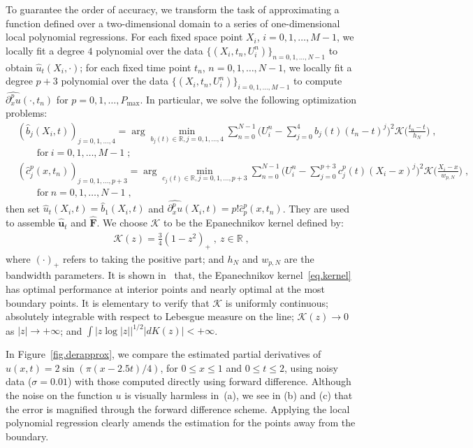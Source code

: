\documentclass[a4paper,11pt]{article}
\newcommand{\bF}{\mathbf{F}}
\newcommand{\bu}{\mathbf{u}}
\begin{document}
To guarantee the order of accuracy, we transform the task of approximating a function defined over a two-dimensional domain to a series of one-dimensional local polynomial regressions. For each fixed space point $X_i$, $i=0,1,\dots,M-1$, we locally fit a degree $4$ polynomial over the data $\{(X_i,t_n,U_i^n)\}_{n=0,1,\dots,N-1}$ to obtain $\widehat{u}_t(X_i,\cdot)$; for each fixed time point $t_n$, $n=0,1,\dots,N-1$, we locally fit a degree $p+3$ polynomial over the data $\{(X_i,t_n,U_i^n)\}_{i=0,1,\dots,M-1}$ to compute $\widehat{\partial_x^pu}(\cdot,t_n)$ for $p=0,1,\dots,P_{\max}$. In particular, we solve the following optimization problems:
\begin{align}
&(\widehat{b}_j(X_i,t))_{j=0,1,\dots,4}=\arg\min_{b_j(t)\in\mathbb{R},j=0,1,\dots,4}\sum_{n=0}^{N-1}\big(U_i^n-\sum_{j=0}^{4}b_j(t)(t_n-t)^j\big)^2\mathcal{K}\big(\frac{t_n-t}{h_N}\big)\;,\nonumber\\
&\quad\quad\text{for}~i=0,1,\dots,M-1\;;\\
&(\widehat{c}^p_j(x,t_n))_{j=0,1,\dots,p+3}=\arg\min_{c_j(t)\in\mathbb{R},j=0,1,\dots,p+3}\sum_{n=0}^{N-1}\big(U_i^n-\sum_{j=0}^{p+3}c^p_j(t)(X_i-x)^j\big)^2\mathcal{K}\big(\frac{X_i-x}{w_{p,N}}\big)\;,\nonumber\\
&\quad\quad\text{for}~n=0,1,\dots,N-1\;,
\end{align}
then set $\widehat{u}_t(X_i,t) = \widehat{b}_1(X_i,t)$ and $\widehat{\partial_x^pu}(X_i,t) = p!\widehat{c}^p_{p}(x,t_n)$. They are used to assemble $\widehat{\bu}_t$ and $\widehat{\bF}$. We choose $\mathcal{K}$ to be the Epanechnikov kernel defined by:
\begin{align}
	\mathcal{K}(z) = \frac{3}{4}(1-z^2)_+\;,~z\in\mathbb{R}\;,\label{eq.kernel}
\end{align}
where $(\cdot)_+$ refers to taking the positive part; and $h_N$ and $w_{p,N}$ are the bandwidth parameters. It is shown in~\cite{fan1997local} that, the Epanechnikov kernel~\eqref{eq.kernel} has optimal performance at interior points and nearly optimal at the most boundary points. It is elementary to verify that $\mathcal{K}$ is uniformly continuous; absolutely integrable with respect to Lebesgue measure on the line; $\mathcal{K}(z)\to 0$ as $|z|\to+\infty$; and  $\int |z\log|z||^{1/2}|dK(z)|<+\infty$.

In Figure~\ref{fig.derapprox}, we compare the estimated partial derivatives of $u(x,t) = 2\sin(\pi(x-2.5t)/4)$, for $0\leq x\leq 1$ and $0\leq t\leq 2$, using noisy data ($\sigma=0.01$) with those computed directly using forward difference. Although the noise on the function $u$ is visually harmless in~(a), we see in (b) and (c) that the error is magnified through the forward difference scheme. Applying the local polynomial regression clearly amends the estimation for the points away from the boundary.  
\end{document}
